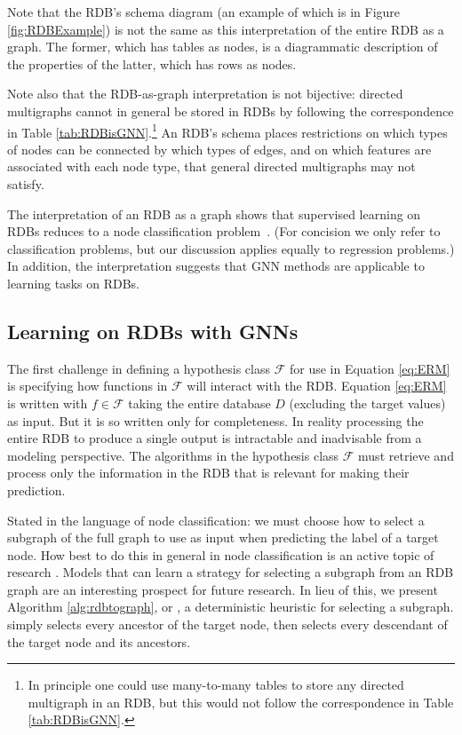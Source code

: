 \documentclass{article}
\begin{document}
Note that the RDB's schema diagram (an example of which is in Figure \ref{fig:RDBExample}) is not the same as this interpretation of the entire RDB as a graph. The former, which has tables as nodes, is a diagrammatic description of the properties of the latter, which has rows as nodes.

Note also that the RDB-as-graph interpretation is not bijective: directed multigraphs cannot in general be stored in RDBs by following the correspondence in Table \ref{tab:RDBisGNN}.\footnote{In principle one could use many-to-many tables to store any directed multigraph in an RDB, but this would not follow the correspondence in Table \ref{tab:RDBisGNN}.}  An RDB's schema places restrictions on which types of nodes can be connected by which types of edges, and on which features are associated with each node type, that general directed multigraphs may not satisfy.

The interpretation of an RDB as a graph shows that supervised learning on RDBs reduces to a node classification problem~\citep{atwood2016diffusion}. (For concision we only refer to classification problems, but our discussion applies equally to regression problems.)  In addition, the interpretation suggests that GNN methods are applicable to learning tasks on RDBs.

\subsection{Learning on RDBs with GNNs}

The first challenge in defining a hypothesis class $\mathcal{F}$ for use in Equation \ref{eq:ERM} is specifying how functions in $\mathcal{F}$ will interact with the RDB.  Equation \ref{eq:ERM} is written with $f \in \mathcal{F}$ taking the entire database $D$ (excluding the target values) as input.  But it is so written only for completeness.  In reality processing the entire RDB to produce a single output is intractable and inadvisable from a modeling perspective.  The algorithms in the hypothesis class $\mathcal{F}$ must retrieve and process only the information in the RDB that is relevant for making their prediction.

Stated in the language of node classification: we must choose how to select a subgraph of the full graph to use as input when predicting the label of a target node.  How best to do this in general in node classification is an active topic of research \citep{hamilton2017inductive}.  Models that can learn a strategy for selecting a subgraph from an RDB graph are an interesting prospect for future research.  In lieu of this, we present Algorithm \ref{alg:rdbtograph}, or , a deterministic heuristic for selecting a subgraph.   simply selects every ancestor of the target node, then selects every descendant of the target node and its ancestors.
\end{document}
